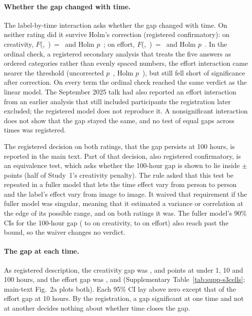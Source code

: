 \paragraph*{Whether the gap changed with time.}
The label-by-time interaction asks whether the gap changed with time. On neither rating did it survive Holm's correction (registered confirmatory): on creativity, $F$(\SThreeCreatSourceByTimeDfNum,~\SThreeCreatSourceByTimeDfDen)~=~\SThreeCreatSourceByTimeF{} and Holm $p$~\SThreeCreatSourceByTimePHolm; on effort, $F$(\SThreeEffSourceByTimeDfNum,~\SThreeEffSourceByTimeDfDen)~=~\SThreeEffSourceByTimeF{} and Holm $p$~\SThreeEffSourceByTimePHolm. In the ordinal check, a registered secondary analysis that treats the five answers as ordered categories rather than evenly spaced numbers, the effort interaction came nearer the threshold (uncorrected $p$~\SThreeEffSourceByTimeOrdP, Holm $p$~\SThreeEffSourceByTimeOrdPHolm), but still fell short of significance after correction. On every term the ordinal check reached the same verdict as the linear model. The September 2025 talk had also reported an effort interaction from an earlier analysis that still included participants the registration later excluded; the registered model does not reproduce it. A nonsignificant interaction does not show that the gap stayed the same, and no test of equal gaps across times was registered.

The registered decision on both ratings, that the gap persists at 100 hours, is reported in the main text. Part of that decision, also registered confirmatory, is an equivalence test, which asks whether the 100-hour gap is shown to lie inside $\pm$\SourceBound{} points (half of Study~1's creativity penalty). The rule asked that this test be repeated in a fuller model that lets the time effect vary from person to person and the label's effect vary from image to image. It waived that requirement if the fuller model was singular, meaning that it estimated a variance or correlation at the edge of its possible range, and on both ratings it was. The fuller model's 90\% CIs for the 100-hour gap (\SThreeCreatGapHundredSlopeLoNinety{} to \SThreeCreatGapHundredSlopeHiNinety{} on creativity, \SThreeEffGapHundredSlopeLoNinety{} to \SThreeEffGapHundredSlopeHiNinety{} on effort) also reach past the bound, so the waiver changes no verdict.

\paragraph*{The gap at each time.}
As registered description, the creativity gap was \SThreeCreatGapUnderOneHourEst, \SThreeCreatGapTenHoursEst{} and \SThreeCreatGapHundredHoursEst{} points at under 1, 10 and 100 hours, and the effort gap was \SThreeEffGapUnderOneHourEst, \SThreeEffGapTenHoursEst{} and \SThreeEffGapHundredHoursEst{} (Supplementary Table~\ref{tab:supp-s3cells}; main-text Fig.~2a plots both). Each 95\% CI lay above zero except that of the effort gap at 10 hours. By the registration, a gap significant at one time and not at another decides nothing about whether time closes the gap.

